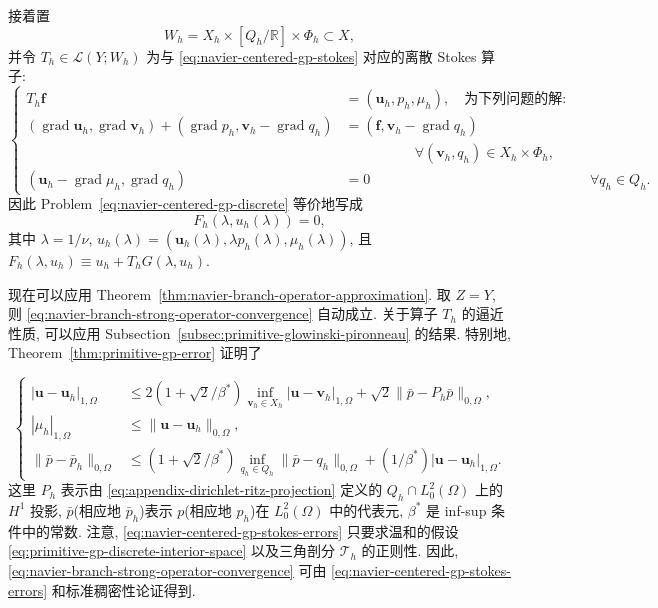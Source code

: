 接着置
\[
W_h=X_h\times[Q_h/\mathbb R]\times\Phi_h\subset X,
\]
并令 $T_h\in\mathcal L(Y;W_h)$ 为与
\eqref{eq:navier-centered-gp-stokes} 对应的离散 Stokes 算子:
\begin{equation}\label{eq:navier-centered-gp-discrete-stokes}
\left\{
\begin{aligned}
T_h\boldsymbol f&=(\boldsymbol u_h,p_h,\mu_h),\quad\text{为下列问题的解}:\\
(\operatorname{grad}\boldsymbol u_h,\operatorname{grad}\boldsymbol v_h)
+(\operatorname{grad}p_h,\boldsymbol v_h-\operatorname{grad}q_h)
&=(\boldsymbol f,\boldsymbol v_h-\operatorname{grad}q_h)\\
&\hspace{5em}\forall(\boldsymbol v_h,q_h)\in X_h\times\Phi_h,\\
(\boldsymbol u_h-\operatorname{grad}\mu_h,\operatorname{grad}q_h)&=0
&&\forall q_h\in Q_h.
\end{aligned}
\right.
\end{equation}
因此 Problem~\eqref{eq:navier-centered-gp-discrete} 等价地写成
\[
F_h(\lambda,u_h(\lambda))=0,
\]
其中 $\lambda=1/\nu$,
$u_h(\lambda)=(\boldsymbol u_h(\lambda),\lambda p_h(\lambda),
\mu_h(\lambda))$, 且
$F_h(\lambda,u_h)\equiv u_h+T_hG(\lambda,u_h)$.

现在可以应用 Theorem~\ref{thm:navier-branch-operator-approximation}. 取 $Z=Y$,
则 \eqref{eq:navier-branch-strong-operator-convergence} 自动成立. 关于算子 $T_h$
的逼近性质, 可以应用 Subsection~\ref{subsec:primitive-glowinski-pironneau}
的结果. 特别地, Theorem~\ref{thm:primitive-gp-error} 证明了

\begin{equation}\label{eq:navier-centered-gp-stokes-errors}
\left\{
\begin{aligned}
|\boldsymbol u-\boldsymbol u_h|_{1,\Omega}
&\leq2(1+\sqrt2/\beta^*)
\inf_{\boldsymbol v_h\in X_h}|\boldsymbol u-\boldsymbol v_h|_{1,\Omega}
+\sqrt2\|\bar p-P_h\bar p\|_{0,\Omega},\\
|\mu_h|_{1,\Omega}&\leq\|\boldsymbol u-\boldsymbol u_h\|_{0,\Omega},\\
\|\bar p-\bar p_h\|_{0,\Omega}
&\leq(1+\sqrt2/\beta^*)
\inf_{q_h\in Q_h}\|\bar p-q_h\|_{0,\Omega}
+(1/\beta^*)|\boldsymbol u-\boldsymbol u_h|_{1,\Omega}.
\end{aligned}
\right.
\end{equation}
这里 $P_h$ 表示由 \eqref{eq:appendix-dirichlet-ritz-projection} 定义的
$Q_h\cap L_0^2(\Omega)$ 上的 $H^1$ 投影,
$\bar p$(相应地 $\bar p_h$)表示 $p$(相应地 $p_h$)在
$L_0^2(\Omega)$ 中的代表元, $\beta^*$ 是 inf-sup 条件中的常数.
注意, \eqref{eq:navier-centered-gp-stokes-errors} 只要求温和的假设
\eqref{eq:primitive-gp-discrete-interior-space} 以及三角剖分 $\mathcal T_h$ 的正则性.
因此, \eqref{eq:navier-branch-strong-operator-convergence} 可由
\eqref{eq:navier-centered-gp-stokes-errors} 和标准稠密性论证得到.

